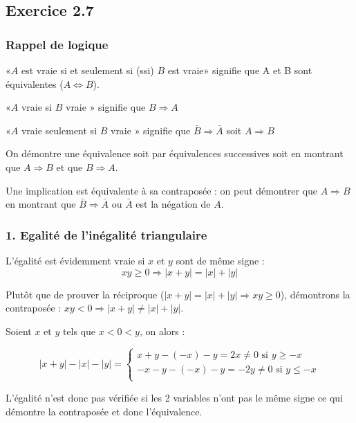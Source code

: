 \documentclass[a4paper,10pt]{report}
\begin{document}
\subsection*{Exercice 2.7}

\subsubsection*{Rappel de logique}

«$A$ est vraie si et seulement si (ssi) $B$ est vraie» signifie que A et B sont équivalentes ($A\Longleftrightarrow B$).

«$A$ vraie si $B$ vraie » signifie que $B \Rightarrow A$

«$A$ vraie seulement si $B$ vraie » signifie que  $\bar{B} \Rightarrow \bar{A}$ soit $A \Rightarrow B$

On démontre une équivalence soit par équivalences successives soit en montrant que $A\Rightarrow B$ et que 
$B\Rightarrow A$.

Une implication est équivalente à sa contraposée : on peut démontrer que $A\Rightarrow B$ en montrant que
$\bar{B}\Rightarrow \bar{A}$ ou $\bar{A}$ est la négation de $A$.

\subsubsection*{1. Egalité de l'inégalité triangulaire}


L'égalité est évidemment vraie si $x$ et $y$ sont de même signe :
\begin{displaymath}
	xy \geq 0 \Longrightarrow |x+y| = |x| + |y|
\end{displaymath}

Plutôt que de prouver la réciproque ($|x+y| = |x| + |y| \Longrightarrow xy \geq 0$), démontrons
la contraposée : $xy < 0 \Longrightarrow |x+y| \neq |x| + |y|$.

Soient $x$ et $y$ tels que $ x < 0 < y$, on alors :

\begin{displaymath}
		|x+y| - |x| - |y|
		= \begin{cases}
			x+y-(-x)-y = 2x \neq 0 \text { si } y \geq -x \\
			-x-y-(-x)-y = -2y \neq 0 \text { si } y \leq -x \\
		\end{cases}
\end{displaymath}

L'égalité n'est donc pas vérifiée si les 2 variables n'ont pas le même signe ce qui démontre la contraposée
et donc l'équivalence.
\end{document}
